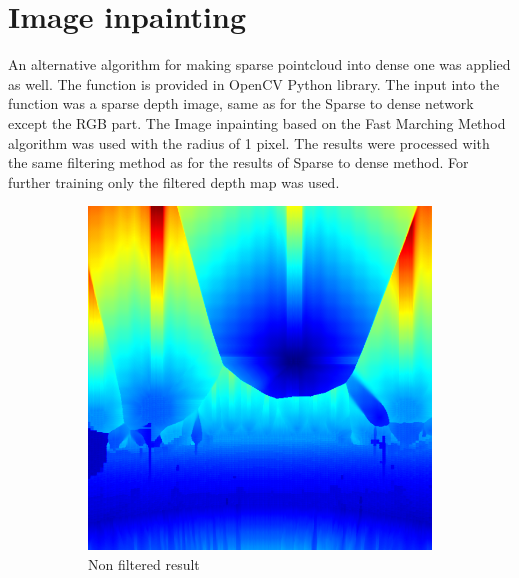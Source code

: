\documentclass[twoside]{ctuthesis}
\theoremstyle{plain}
\theoremstyle{definition}
\theoremstyle{note}
\begin{document}
\section{Image inpainting}
An alternative algorithm for making sparse pointcloud into dense one was applied as well. The function is provided in OpenCV Python library. The input into the function was a sparse depth image, same as for the Sparse to dense network except the RGB part. The Image inpainting based on the Fast Marching Method algorithm was used with the radius of 1 pixel. The results were processed with the same filtering method as for the results of Sparse to dense method. For further training only the filtered depth map was used.
\begin{figure}[h]
	\centering
	\begin{subfigure}[b]{0.3\textwidth}
		\centering
		\includegraphics[width=\textwidth]{raw_inpaint.png}
		\caption{Non filtered result}
	\end{subfigure}
	\hfill
	\begin{subfigure}[b]{0.3\textwidth}
		\centering

\end{subfigure}
\end{figure}
\end{document}
